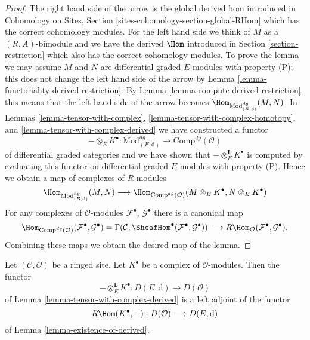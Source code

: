 \begin{proof}
The right hand side of the arrow is the global derived hom introduced
in Cohomology on Sites, Section \ref{sites-cohomology-section-global-RHom}
which has the correct cohomology modules.
For the left hand side we think of $M$ as a $(R, A)$-bimodule and
we have the derived $\Hom$ introduced in Section \ref{section-restriction}
which also has the correct cohomology modules.
To prove the lemma we may assume $M$ and $N$ are differential graded
$E$-modules with property (P); this does not change the left hand
side of the arrow by
Lemma \ref{lemma-functoriality-derived-restriction}.
By Lemma \ref{lemma-compute-derived-restriction}
this means that the left hand side of the arrow becomes
$\Hom_{\text{Mod}^{dg}_{(B, \text{d})}}(M, N)$.
In Lemmas \ref{lemma-tensor-with-complex},
\ref{lemma-tensor-with-complex-homotopy}, and
\ref{lemma-tensor-with-complex-derived}
we have constructed a functor
$$
- \otimes_E K^\bullet :
\text{Mod}^{dg}_{(E, \text{d})}
\longrightarrow
\text{Comp}^{dg}(\mathcal{O})
$$
of differential graded categories
and we have shown that $- \otimes_E^\mathbf{L} K^\bullet$ is computed
by evaluating this functor
on differential graded $E$-modules with property (P).
Hence we obtain a map of complexes of $R$-modules
$$
\Hom_{\text{Mod}^{dg}_{(B, \text{d})}}(M, N)
\longrightarrow
\Hom_{\text{Comp}^{dg}(\mathcal{O})}
(M \otimes_E K^\bullet, N \otimes_E K^\bullet)
$$
For any complexes of $\mathcal{O}$-modules
$\mathcal{F}^\bullet$, $\mathcal{G}^\bullet$ there
is a canonical map
$$
\Hom_{\text{Comp}^{dg}(\mathcal{O})}
(\mathcal{F}^\bullet, \mathcal{G}^\bullet) =
\Gamma(\mathcal{C},
\SheafHom^\bullet(\mathcal{F}^\bullet, \mathcal{G}^\bullet))
\longrightarrow
R\Hom_\mathcal{O}(\mathcal{F}^\bullet, \mathcal{G}^\bullet).
$$
Combining these maps
we obtain the desired map of the lemma.
\end{proof}

\begin{lemma}
\label{lemma-tensor-with-complex-hom-adjoint}
Let $(\mathcal{C}, \mathcal{O})$ be a ringed site.
Let $K^\bullet$ be a complex of $\mathcal{O}$-modules.
Then the functor
$$
- \otimes_E^\mathbf{L} K^\bullet :
D(E, \text{d})
\longrightarrow
D(\mathcal{O})
$$
of Lemma \ref{lemma-tensor-with-complex-derived} is a left adjoint
of the functor
$$
R\Hom(K^\bullet, -) : D(\mathcal{O}) \longrightarrow D(E, \text{d})
$$
of Lemma \ref{lemma-existence-of-derived}.
\end{lemma}

